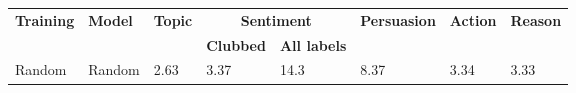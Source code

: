 \begin{landscape}


\begin{table}
\centering
\begin{adjustbox}{max width=1.5\textwidth}
\begin{tabular}{llllllll}
\toprule[1.2pt]
\multirow{2}{*}{\textbf{Training}} & \multirow{2}{*}{\textbf{Model}} & \multirow{2}{*}{\textbf{Topic}} & \multicolumn{2}{c}{\textbf{Sentiment}} & \multirow{2}{*}{\textbf{Persuasion}} & \multirow{2}{*}{\textbf{Action}} & \multirow{2}{*}{\textbf{Reason}} \\
& & & \textbf{Clubbed} & \textbf{All labels} & & & \\
\midrule[1.2pt]

Random & Random & 2.63 & 3.37 & 14.3 & 8.37 & 3.34 & 3.33 \\
\hline


\end{tabular}
\end{adjustbox}
\end{table}
\end{landscape}
